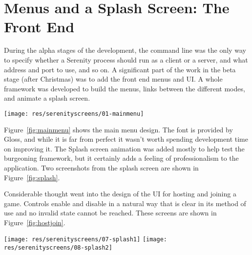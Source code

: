 \section{Menus and a Splash Screen: The Front End}


During the alpha stages of the development, the command line was the only way to specify whether a Serenity process should run as a client or a server, and what address and port to use, and so on. A significant part of the work in the beta stage (after Christmas) was to add the front end menus and UI. A whole framework was developed to build the menus, links between the different modes, and animate a splash screen. 

\begin{figure*}
	\hspace{-2.5em}\texttt{[image: res/serenityscreens/01-mainmenu]}
	\caption[Screenshot of the main menu]{Screenshot of the main menu.}
	\label{fig:mainmenu}
\end{figure*}

Figure~\ref{fig:mainmenu} shows the main menu design. The font is provided by Gloss, and while it is far from perfect it wasn't worth spending development time on improving it. The Splash screen animation was added mostly to help test the burgeoning framework, but it certainly adds a feeling of professionalism to the application. Two screenshots from the splash screen are shown in Figure~\ref{fig:splash}.

Considerable thought went into the design of the UI for hosting and joining a game. Controls enable and disable in a natural way that is clear in its method of use and no invalid state cannot be reached. These screens are shown in Figure~\ref{fig:hostjoin}.

\begin{figure*}[p]
	\texttt{[image: res/serenityscreens/07-splash1]}
	\texttt{[image: res/serenityscreens/08-splash2]}
	\caption[Splash screens shown on launch]{Screenshot of the splash screens shown when the game is launched.}
	\label{fig:splash}
\end{figure*}

